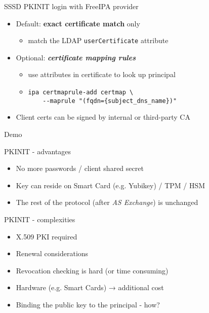 \documentclass[ignorenonframetext,aspectratio=169,12pt]{beamer}
\begin{document}
\begin{frame}{SSSD PKINIT login with FreeIPA provider}
\protect\hypertarget{pkinit-in-freeipa}{}
\begin{itemize}
    \item Default: {\bf exact certificate match} only
        \begin{itemize}
            \item match the LDAP {\tt userCertificate} attribute
        \end{itemize}
    \item Optional: \textbf{\em certificate mapping rules}
        \begin{itemize}
            \item use attributes in certificate to look up principal
            \item {\tt ipa certmaprule-add certmap \textbackslash{} \\
                ~~~~{-}{-}maprule "(fqdn=\{subject\_dns\_name\})"}
        \end{itemize}
    \item Client certs can be signed by internal or third-party CA
\end{itemize}
\end{frame}

\begin{frame}[plain]
\centering
\huge Demo
\end{frame}


\begin{frame}{PKINIT - advantages}
\protect\hypertarget{pkinit-advantages}{}
\begin{itemize}
    \item No more passwords / client shared secret
    \item Key can reside on Smart Card (e.g. Yubikey) / TPM / HSM
    \item The rest of the protocol (after {\em AS Exchange}) is unchanged
\end{itemize}
\end{frame}

\begin{frame}{PKINIT - complexities}
\protect\hypertarget{pkinit-complexities}{}
\begin{itemize}
    \item X.509 PKI required
    \item Renewal considerations
    \item Revocation checking is hard (or time consuming)
    \item Hardware (e.g. Smart Cards) → additional cost
    \item Binding the public key to the principal - how?
\end{itemize}
\end{frame}
\end{document}
